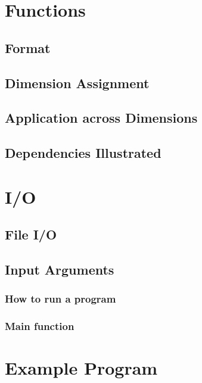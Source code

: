 \documentclass[titlepage]{article}
\begin{document}
\section{Functions}
\subsection{Format}
\subsection{Dimension Assignment}
\subsection{Application across Dimensions}
\subsection{Dependencies Illustrated}
\section{I/O}
\subsection{File I/O}
\subsection{Input Arguments}
\subsubsection{How to run a program}
\subsubsection{Main function}
\section{Example Program}
\end{document}
